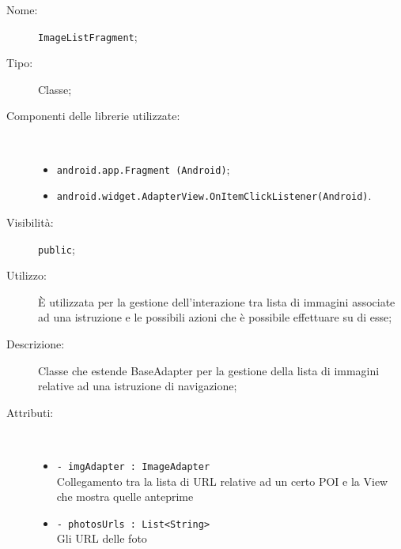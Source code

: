 \documentclass[../DefinizioneDiProdotto.tex]{subfiles}
\begin{document}
\begin{description}
	\item[Nome:] \texttt{ImageListFragment};
	\item[Tipo:] Classe;
	\item[Componenti delle librerie utilizzate:] \
	\begin{itemize}
		\item \texttt{android.app.Fragment (Android)};
		
		\item \texttt{android.widget.AdapterView.OnItemClickListener(Android)}.
		
	\end{itemize}
	\item[Visibilità:] \texttt{public};
	\item[Utilizzo:] È utilizzata per la gestione dell'interazione tra lista di immagini associate ad una istruzione e le possibili azioni che è possibile effettuare su di esse;
	\item[Descrizione:] Classe che estende BaseAdapter per la gestione della lista di immagini relative ad una istruzione di navigazione;
	\item[Attributi:] \
	\begin{itemize}
		\item \texttt{- imgAdapter : ImageAdapter}\\
		Collegamento tra la lista di URL relative ad un certo POI e la View che mostra quelle anteprime
		
		\item \texttt{- photosUrls : List<String>}\\
		Gli URL delle foto
		

\end{itemize}
\end{description}
\end{document}
